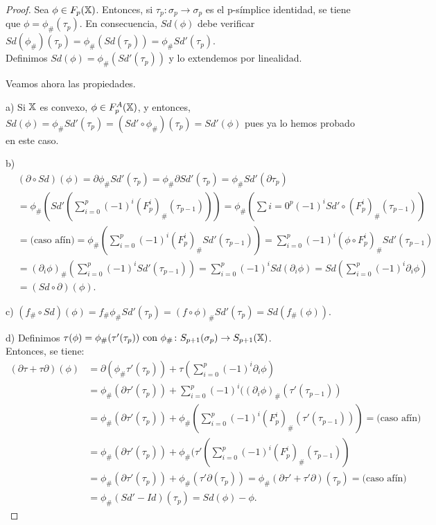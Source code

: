 \begin{proof}
  Sea $\phi \in F_p({\mathbb X})$. Entonces, si $\tau_p \colon \sigma_p \to \sigma_p$ es el p-símplice identidad, se tiene que
  $\phi = \phi_\#(\tau_p)$. En consecuencia, $Sd(\phi)$ debe verificar $Sd(\phi_\#)(\tau_p) = \phi_\#(Sd(\tau_p)) = \phi_\# Sd'(\tau_p)$. \\
  Definimos $Sd(\phi) = \phi_\#(Sd'(\tau_p))$ y lo extendemos por linealidad.

  Veamos ahora las propiedades.

  a) Si ${\mathbb X}$ es convexo, $\phi \in F_p^A({\mathbb X})$, y entonces, $Sd(\phi) = \phi_\# Sd'(\tau_p) = (Sd' \circ \phi_\#)(\tau_p) = Sd'(\phi)$
  pues ya lo hemos probado en este caso.

  b) \begin{align*}
    &(\partial \circ Sd)(\phi) = \partial \phi_\# Sd'(\tau_p) = \phi_\# \partial Sd'(\tau_p) = \phi_\# Sd'(\partial \tau_p) \\
    &= \phi_\#(Sd'(\sum\limits_{i = 0}^p (-1)^i (F_p^i)_\# (\tau_{p-1}))) = \phi_\#(\sum\limits{i = 0}^p (-1)^i Sd' \circ (F_p^i)_\#(\tau_{p-1}))\\
    &= \text{(caso afín)} = \phi_\#(\sum\limits_{i = 0}^p (-1)^i (F_p^i)_\# Sd'(\tau_{p-1})) = \sum\limits_{i = 0}^p (-1)^i (\phi \circ F_p^i)_\# Sd'(\tau_{p-1}) \\
    &= (\partial_i \phi)_\# (\sum\limits_{i = 0}^p (-1)^i Sd'(\tau_{p-1})) = \sum\limits_{i = 0}^p (-1)^i Sd(\partial_i \phi) = Sd(\sum\limits_{i = 0}^p (-1)^i \partial_i \phi) \\
    &= (Sd \circ \partial)(\phi).
  \end{align*}

  c) $(f_\# \circ Sd)(\phi) = f_\# \phi_\# Sd'(\tau_p) = (f \circ \phi)_\# Sd'(\tau_p) = Sd(f_\#(\phi))$.

  d) Definimos $\tau(\phi) = \phi_\#(\tau'(\tau_p)) \text{ con } \phi_\# \colon S_{p+1}(\sigma_p) \to S_{p+1}({\mathbb X})$. \\
  Entonces, se tiene:
  \begin{align*}
    (\partial \tau + \tau \partial)(\phi) &= \partial(\phi_\# \tau'(\tau_p)) + \tau(\sum\limits_{i = 0}^p (-1)^i \partial_i \phi) \\
    &= \phi_\#(\partial \tau'(\tau_p)) + \sum\limits_{i = 0}^p (-1)^i((\partial_i \phi)_\#(\tau'(\tau_{p-1})) \\
    &= \phi_\#(\partial \tau'(\tau_p)) + \phi_\#(\sum\limits_{i = 0}^p (-1)^i (F_p^i)_\# (\tau'(\tau_{p-1}))) = \text{(caso afín)} \\
    &= \phi_\#(\partial \tau'(\tau_p)) + \phi_\#(\tau'(\sum\limits_{i = 0}^p (-1)^i (F_p^i)_\#(\tau_{p-1})) \\
    &= \phi_\#(\partial \tau'(\tau_p)) + \phi_\#(\tau'\partial(\tau_p)) = \phi_\#(\partial \tau' + \tau' \partial)(\tau_p) = \text{(caso afín)} \\
    &= \phi_\#(Sd' - Id)(\tau_p) = Sd(\phi) - \phi.
  \end{align*}


\end{proof}
